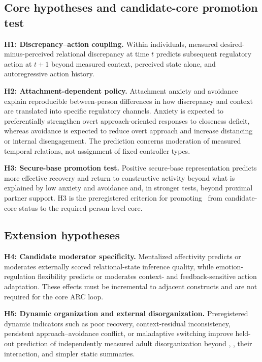 

\subsection{Core hypotheses and candidate-core promotion test}

\textbf{H1: Discrepancy--action coupling.} Within individuals, measured desired-minus-perceived relational discrepancy at time \(t\) predicts subsequent regulatory action at \(t+1\) beyond measured context, perceived state alone, and autoregressive action history.

\textbf{H2: Attachment-dependent policy.} Attachment anxiety and avoidance explain reproducible between-person differences in how discrepancy and context are translated into specific regulatory channels. Anxiety is expected to preferentially strengthen overt approach-oriented responses to closeness deficit, whereas avoidance is expected to reduce overt approach and increase distancing or internal disengagement. The prediction concerns moderation of measured temporal relations, not assignment of fixed controller types.

\textbf{H3: Secure-base promotion test.} Positive secure-base representation predicts more effective recovery and return to constructive activity beyond what is explained by low anxiety and avoidance and, in stronger tests, beyond proximal partner support. H3 is the preregistered criterion for promoting \Sec\ from candidate-core status to the required person-level core.

\subsection{Extension hypotheses}

\textbf{H4: Candidate moderator specificity.} Mentalized affectivity predicts or moderates externally scored relational-state inference quality, while emotion-regulation flexibility predicts or moderates context- and feedback-sensitive action adaptation. These effects must be incremental to adjacent constructs and are not required for the core ARC loop.

\textbf{H5: Dynamic organization and external disorganization.} Preregistered dynamic indicators such as poor recovery, context-residual inconsistency, persistent approach--avoidance conflict, or maladaptive switching improve held-out prediction of independently measured adult disorganization beyond \Anx, \Avo, their interaction, and simpler static summaries.

